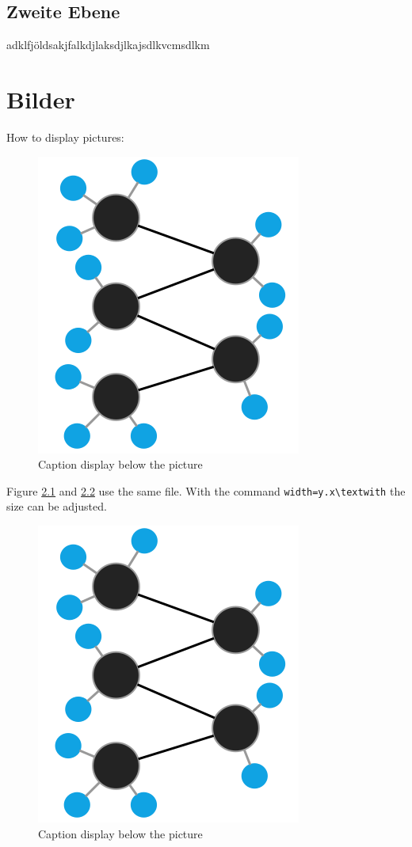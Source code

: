 \documentclass[a4paper, 11pt]{scrreprt}
\begin{document}
\section{Zweite Ebene}
adklfjöldsakjfalkdjlaksdjlkajsdlkvcmsdlkm



\newpage
\chapter{Bilder}
How to display pictures:

\begin{figure}[H] %
  \centering %
  \includegraphics[width=.25\textwidth]{graphics/molecule}
  \caption[Caption for the list of figures]{Caption display below the picture}
  \label{fig:pic1} %
\end{figure}
\noindent
Figure \ref{fig:pic1} and \ref{fig:pic2} use the same file. With the command \verb+width=y.x\textwith+ the size can be adjusted.
\begin{figure}[H] %
  \centering %
  \includegraphics[width=.5\textwidth]{graphics/molecule}
  \caption[Caption for the list of figures]{Caption display below the picture}
  \label{fig:pic2} %
\end{figure}
\noindent
\end{document}
